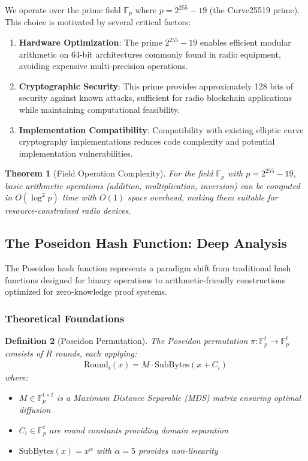 \documentclass[11pt,a4paper]{article}
\newtheorem{theorem}{Theorem}[section]
\newtheorem{definition}[theorem]{Definition}
\begin{document}
We operate over the prime field $\mathbb{F}_p$ where $p = 2^{255} - 19$ (the Curve25519 prime). This choice is motivated by several critical factors:

\begin{enumerate}
\item \textbf{Hardware Optimization}: The prime $2^{255} - 19$ enables efficient modular arithmetic on 64-bit architectures commonly found in radio equipment, avoiding expensive multi-precision operations.

\item \textbf{Cryptographic Security}: This prime provides approximately 128 bits of security against known attacks, sufficient for radio blockchain applications while maintaining computational feasibility.

\item \textbf{Implementation Compatibility}: Compatibility with existing elliptic curve cryptography implementations reduces code complexity and potential implementation vulnerabilities.
\end{enumerate}

\begin{theorem}[Field Operation Complexity]
For the field $\mathbb{F}_p$ with $p = 2^{255} - 19$, basic arithmetic operations (addition, multiplication, inversion) can be computed in $O(\log^2 p)$ time with $O(1)$ space overhead, making them suitable for resource-constrained radio devices.
\end{theorem}

\subsection{The Poseidon Hash Function: Deep Analysis}

The Poseidon hash function represents a paradigm shift from traditional hash functions designed for binary operations to arithmetic-friendly constructions optimized for zero-knowledge proof systems.

\subsubsection{Theoretical Foundations}

\begin{definition}[Poseidon Permutation]
The Poseidon permutation $\pi: \mathbb{F}_p^t \rightarrow \mathbb{F}_p^t$ consists of $R$ rounds, each applying:
\begin{align}
\text{Round}_i(x) = M \cdot \text{SubBytes}(x + C_i)
\end{align}
where:
\begin{itemize}
\item $M \in \mathbb{F}_p^{t \times t}$ is a Maximum Distance Separable (MDS) matrix ensuring optimal diffusion
\item $C_i \in \mathbb{F}_p^t$ are round constants providing domain separation
\item $\text{SubBytes}(x) = x^{\alpha}$ with $\alpha = 5$ provides non-linearity
\end{itemize}
\end{definition}
\end{document}
